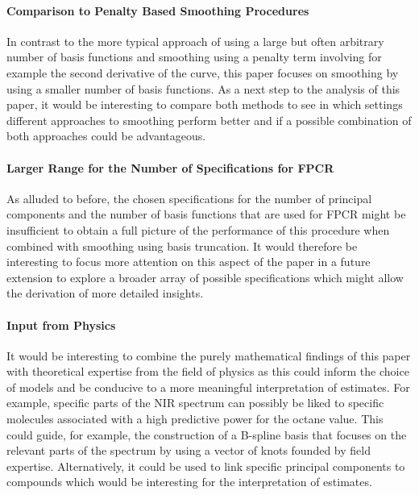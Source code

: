 \documentclass[11pt,twoside,a4paper]{article}
\begin{document}
	\paragraph{Comparison to Penalty Based Smoothing Procedures}
	In contrast to the more typical approach of using a large but often arbitrary number of basis functions and smoothing using a penalty term involving for example the second derivative of the curve, this paper focuses on smoothing by using a smaller number of basis functions. As a next step to the analysis of this paper, it would be interesting to compare both methods to see in which settings different approaches to smoothing perform better and if a possible combination of both approaches could be advantageous.
	\vspace{-0.2cm}
	
	\paragraph{Larger Range for the Number of Specifications for FPCR}
	As alluded to before, the chosen specifications for the number of principal components and the number of basis functions that are used for FPCR might be insufficient to obtain a full picture of the performance of this procedure when combined with smoothing using basis truncation. It would therefore be interesting to focus more attention on this aspect of the paper in a future extension to explore a broader array of possible specifications which might allow the derivation of more detailed insights.
	\vspace{-0.2cm}
	
	\paragraph{Input from Physics}
	It would be interesting to combine the purely mathematical findings of this paper with theoretical expertise from the field of physics as this could inform the choice of models and be conducive to a more meaningful interpretation of estimates. For example, specific parts of the NIR spectrum can possibly be liked to specific molecules associated with a high predictive power for the octane value. This could guide, for example, the construction of a B-spline basis that focuses on the relevant parts of the spectrum by using a vector of knots founded by field expertise. Alternatively, it could be used to link specific principal components to compounds which would be interesting for the interpretation of estimates.
	\vspace{-0.2cm}
	
\end{document}
